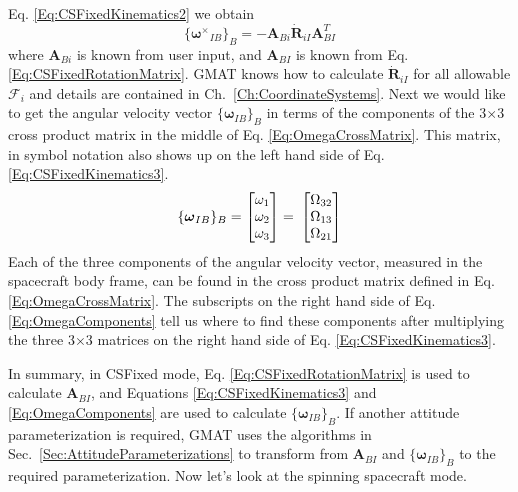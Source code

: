 Eq. \ref{Eq:CSFixedKinematics2} we obtain
%
\begin{equation}
    \{\mathbf{\boldsymbol\omega^\times}_{IB}\}_B =  -\mathbf{A}_{Bi}{\mathbf{\dot R}_{iI}} \mathbf{A}_{BI}^{T}
    \label{Eq:CSFixedKinematics3}
\end{equation}
%
where $\mathbf{A}_{Bi}$ is known from user input, and $\mathbf{A}_{BI}$ is known
from Eq. \ref{Eq:CSFixedRotationMatrix}.  GMAT knows how to calculate
$\mathbf{\dot{R}}_{iI}$ for all allowable $\mathcal{F}_i$ and details are contained
in Ch.~\ref{Ch:CoordinateSystems}.  Next we would like to get the angular
velocity vector $\{\mathbf{\boldsymbol\omega}_{IB}\}_B$ in terms of the
components of the 3$\times$3 cross product matrix in the middle of
Eq. \ref{Eq:OmegaCrossMatrix}.  This matrix, in symbol notation also shows up on
the left hand side of Eq. \ref{Eq:CSFixedKinematics3}.
%
\begin{equation}
	\{\boldsymbol \omega_{IB}\}_{B} =
        \begin{bmatrix}
            \omega_{1} \\
            \omega_{2} \\
            \omega_{3}
        \end{bmatrix} = \hspace{0.082cm}
        \begin{bmatrix}
            \Omega_{32} \\
            \Omega_{13} \\
            \Omega_{21}
        \end{bmatrix}
    \label{Eq:OmegaComponents}
\end{equation}
%
Each of the three components of the angular velocity vector, measured in the
spacecraft body frame, can be found in the cross product matrix defined in
Eq. \ref{Eq:OmegaCrossMatrix}.  The subscripts on the right hand side of
Eq. \ref{Eq:OmegaComponents} tell us where to find these components after
multiplying the three 3$\times$3 matrices on the right hand side of
Eq. \ref{Eq:CSFixedKinematics3}.

In summary, in CSFixed mode, Eq. \ref{Eq:CSFixedRotationMatrix} is used to
calculate $\mathbf{A}_{BI}$, and Equations \ref{Eq:CSFixedKinematics3} and
\ref{Eq:OmegaComponents} are used to calculate
$\{\mathbf{\boldsymbol\omega}_{IB}\}_B$.  If another attitude parameterization
is required, GMAT uses the algorithms in Sec.~\ref{Sec:AttitudeParameterizations}
to transform from $\mathbf{A}_{BI}$ and $\{\mathbf{\boldsymbol\omega}_{IB}\}_B$
to the required parameterization.  Now let's look at the spinning spacecraft
mode.

